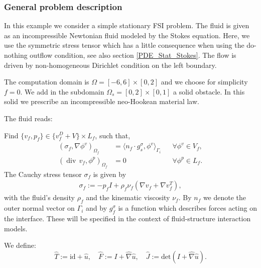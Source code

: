 \subsubsection{General problem description}
   
In this example we consider a simple stationary FSI problem. The fluid
is given as an incompressible Newtonian fluid modeled by the Stokes
equation. Here, we use the symmetric stress tensor which has a little
consequence when using the do-nothing outflow condition, see also
section \ref{PDE_Stat_Stokes}. The flow is driven by non-homogeneous Dirichlet 
condition on the left boundary.

The computation domain is $\Omega = [-6,6]\times [0,2]$ and we choose for
simplicity $f=0$. 
We add in the subdomain $\Omega_s = [0,2]\times [0,1]$ a solid obstacle. In
this 
solid we prescribe an incompressible neo-Hookean material law.



The fluid reads: 
\begin{Problem}
 Find $\{v_f,p_f\} \in \{ v_f^D + V\} \times L_f$, such that,
  \begin{equation*}
    \begin{aligned} 
      (\sigma_f,\nabla\phi^v)_{\Omega_f} 
      &= \langle n_f\cdot g_s^\sigma ,\phi^v \rangle_{\Gamma_i}
      &&\forall \phi^v\in V_f, \\
      (\operatorname{div}\, v_f,\phi^p)_{\Omega_f} &= 0
      &&\forall\phi^p\in L_f.
    \end{aligned}
  \end{equation*}
  The Cauchy stress tensor $\sigma_f$ is given by 
  \begin{eqnarray}
    \sigma_f:=-p_f I + \rho_f\nu_f (\nabla v_f+\nabla v_f^T),
  \end{eqnarray}
  with the fluid's density $\rho_f$  and the kinematic viscosity
  $\nu_f$. By $n_f$ we denote the outer normal vector on $\Gamma_i$
  and by $g^\sigma_f$ is a function which describes forces acting on the interface. These
  will be specified in the context of fluid-structure interaction
  models.  
\end{Problem}
We define:
\begin{equation*}
\hat T:=\text{id}+\hat u,\quad
\hat F:=I+\hat\nabla \hat u,\quad
\hat J:=\text{det}(I+\hat\nabla \hat u).
\end{equation*}


